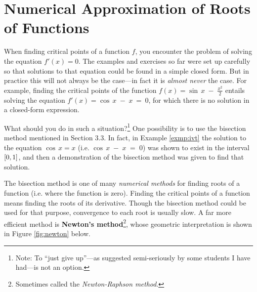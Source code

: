 \section{Numerical Approximation of Roots of Functions}
When finding critical points of a function $f$, you encounter the problem of
solving the equation $f'(x)=0$. The examples and exercises so far were set up
carefully so that solutions to that equation could be found in a simple closed
form. But in practice this will not always be the case---in fact it is
\emph{almost never} the case.
For example, finding the critical points of the function
$f(x) = \sin\,x \;-\; \frac{x^2}{2}$
entails solving the equation $f'(x) = \cos\,x \;-\; x ~=~ 0$, for which there is
no solution in a closed-form expression.

What should you do in such a situation?\footnote{Note: To ``just give up''---as
suggested semi-seriously by some students I have had---is not an option.}  One
possibility is to use the bisection method mentioned in
Section 3.3. In fact, in Example \ref{exmp:ivt} the solution to the equation
$\cos\,x = x$ (i.e. $\cos\,x \;-\; x \;=\;0$) was shown to exist in the interval
$\lbrack 0,1 \rbrack$, and then a demonstration of the bisection method was given to
find that solution.

The bisection method is one of many \emph{numerical methods} for finding roots
of a function (i.e. where the function is zero). Finding the critical points of
a function means finding the roots of its derivative. Though the bisection
method could be used for that purpose, convergence to each root is usually
slow. A far more efficient method is
\textbf{Newton's method}\footnote{Sometimes called the \emph{Newton-Raphson
method}.}, whose geometric interpretation is shown in Figure \ref{fig:newton}
below.

